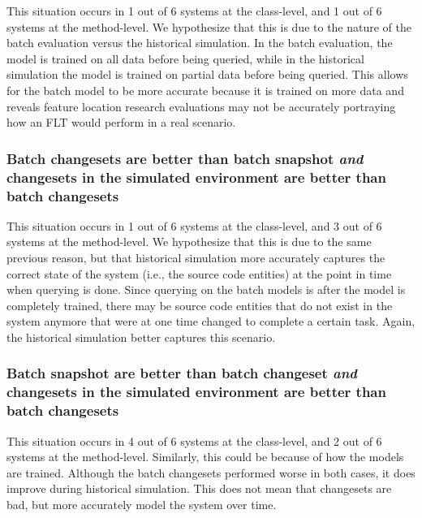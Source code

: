 %

This situation occurs in 1 out of 6 systems at the class-level, and 1 out of 6
systems at the method-level.  We hypothesize that this is due to the nature of
the batch evaluation versus the historical simulation.  In the batch evaluation,
the model is trained on all data before being queried, while in the historical
simulation the model is trained on partial data before being queried.  This
allows for the batch model to be more accurate because it is trained on more
data and reveals feature location research evaluations may not be accurately
portraying how an FLT would perform in a real scenario.

\subsubsection{Batch changesets are better than batch snapshot
\emph{and} changesets in the simulated environment are better than batch changesets}

%

This situation occurs in 1 out of 6 systems at the class-level, and 3 out of 6
systems at the method-level.  We hypothesize that this is due to the same
previous reason, but that historical simulation more accurately captures the
correct state of the system (i.e., the source code entities) at the point in
time when querying is done.  Since querying on the batch models is after the
model is completely trained, there may be source code entities that do not exist
in the system anymore that were at one time changed to complete a certain task.
Again, the historical simulation better captures this scenario.

\subsubsection{Batch snapshot are better than batch changeset
\emph{and} changesets in the simulated environment are better than batch changesets}

%

This situation occurs in 4 out of 6 systems at the class-level, and 2 out of 6
systems at the method-level.  Similarly, this could be because of how the models
are trained.  Although the batch changesets performed worse in both cases, it
does improve during historical simulation.  This does not mean that changesets
are bad, but more accurately model the system over time.

